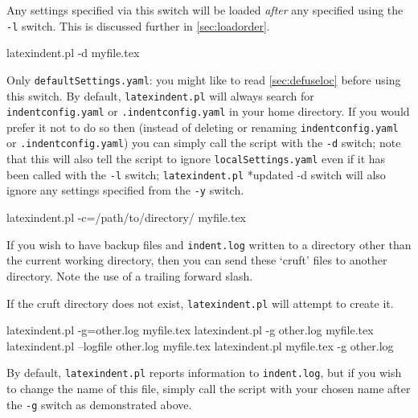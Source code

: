  Any settings specified via this switch will be loaded \emph{after} any specified using
 the \texttt{-l} switch. This is discussed further in \vref{sec:loadorder}.  

 \begin{commandshell}
latexindent.pl -d myfile.tex
\end{commandshell}

 Only \texttt{defaultSettings.yaml}: you might like to read \cref{sec:defuseloc} before
 using this switch. By default, \texttt{latexindent.pl} will always search for
 \texttt{indentconfig.yaml} or \texttt{.indentconfig.yaml} in your home directory. If you
 would prefer it not to do so then (instead of deleting or renaming
 \texttt{indentconfig.yaml} or \texttt{.indentconfig.yaml}) you can simply call the
 script with the \texttt{-d} switch; note that this will also tell the script to ignore
 \texttt{localSettings.yaml} even if it has been called with the \texttt{-l} switch;
 \texttt{latexindent.pl} *{updated -d switch} will also ignore any
 settings specified from the \texttt{-y} switch.%


 \begin{commandshell}
latexindent.pl -c=/path/to/directory/ myfile.tex
\end{commandshell}

 If you wish to have backup files and \texttt{indent.log} written to a directory other
 than the current working directory, then you can send these `cruft' files to another
 directory. Note the use of a trailing forward slash. %

 If the cruft directory does not exist, \texttt{latexindent.pl} will attempt to create
 it.


 \begin{commandshell}
latexindent.pl -g=other.log myfile.tex
latexindent.pl -g other.log myfile.tex
latexindent.pl --logfile other.log myfile.tex
latexindent.pl myfile.tex -g other.log 
\end{commandshell}

 By default, \texttt{latexindent.pl} reports information to \texttt{indent.log}, but if
 you wish to change the name of this file, simply call the script with your chosen name
 after the \texttt{-g} switch as demonstrated above.

